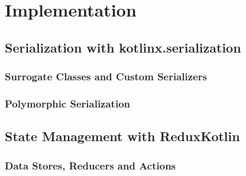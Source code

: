 \chapter{Implementation}
\label{chap:implementation}
\section{Serialization with kotlinx.serialization}
\label{sec:serialization-with-kotlinx-serialization}
\subsection{Surrogate Classes and Custom Serializers}
\label{ssec:surrogate-classes-and-custom-serializers}
\subsection{Polymorphic Serialization}
\label{ssec:polymorphic-serialization}
\section{State Management with ReduxKotlin}
\label{sec:state-management-with-reduxkotlin}
\subsection{Data Stores, Reducers and Actions}
\label{ssec:data-stores-reducers-and-actions}

